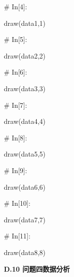 \documentclass{MathorCupModeling}
\begin{document}
\begin{python}
# In[4]:


draw(data1,1)


# In[5]:


draw(data2,2)


# In[6]:


draw(data3,3)


# In[7]:


draw(data4,4)


# In[8]:


draw(data5,5)


# In[9]:


draw(data6,6)


# In[10]:


draw(data7,7)


# In[11]:


draw(data8,8)


\end{python}
\newpage
\textbf{D.10 问题四数据分析}
\end{document}
